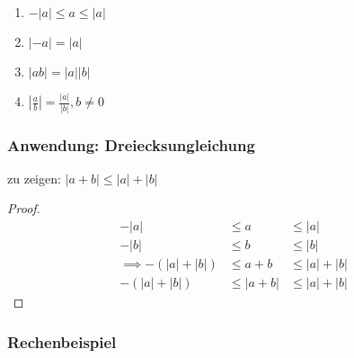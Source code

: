 \begin{enumerate}
 \item $-|a|\leq a \leq |a|$
 \item $|-a| = |a|$
 \item $|ab| = |a||b|$
 \item $\displaystyle\left|\frac{a}{b}\right| = \frac{|a|}{|b|}, b\neq 0$
\end{enumerate}

\subsubsection*{Anwendung: Dreiecksungleichung}
zu zeigen: $|a+b| \leq |a|+|b|$
\begin{proof}
  \begin{align*}
    -|a|&\leq a &\leq |a| \\
    -|b|&\leq b &\leq |b| \\
    \implies -(|a|+|b|)&\leq a+b &\leq |a|+|b| \\
    -(|a|+|b|)&\leq |a+b| &\leq |a|+|b|
  \end{align*}
\end{proof}

\subsubsection*{Rechenbeispiel}

